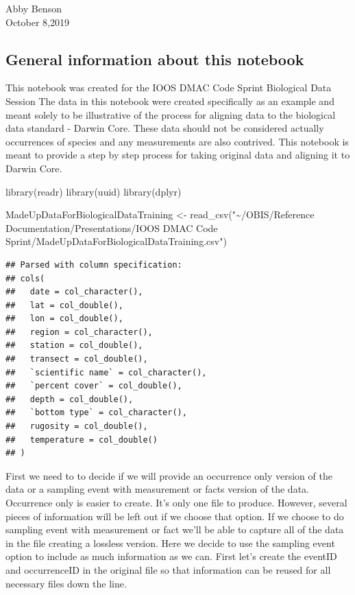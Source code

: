 \documentclass[
]{book}
\newenvironment{Shaded}{\begin{snugshade}}{\end{snugshade}}
\newcommand{\FunctionTok}[1]{\textcolor[rgb]{0.00,0.00,0.00}{#1}}
\newcommand{\NormalTok}[1]{#1}
\newcommand{\OtherTok}[1]{\textcolor[rgb]{0.56,0.35,0.01}{#1}}
\newcommand{\StringTok}[1]{\textcolor[rgb]{0.31,0.60,0.02}{#1}}
\begin{document}
Abby Benson\\
October 8,2019

\hypertarget{general-information-about-this-notebook}{%
\subsection{General information about this notebook}\label{general-information-about-this-notebook}}

This notebook was created for the IOOS DMAC Code Sprint Biological Data Session
The data in this notebook were created specifically as an example and meant solely to be
illustrative of the process for aligning data to the biological data standard - Darwin Core.
These data should not be considered actually occurrences of species and any measurements
are also contrived. This notebook is meant to provide a step by step process for taking
original data and aligning it to Darwin Core.

\begin{Shaded}
\begin{Highlighting}[]
\FunctionTok{library}\NormalTok{(readr)}
\FunctionTok{library}\NormalTok{(uuid)}
\FunctionTok{library}\NormalTok{(dplyr)}

\NormalTok{MadeUpDataForBiologicalDataTraining }\OtherTok{\textless{}{-}} \FunctionTok{read\_csv}\NormalTok{(}\StringTok{"\textasciitilde{}/OBIS/Reference Documentation/Presentations/IOOS DMAC Code Sprint/MadeUpDataForBiologicalDataTraining.csv"}\NormalTok{)}
\end{Highlighting}
\end{Shaded}

\begin{verbatim}
## Parsed with column specification:
## cols(
##   date = col_character(),
##   lat = col_double(),
##   lon = col_double(),
##   region = col_character(),
##   station = col_double(),
##   transect = col_double(),
##   `scientific name` = col_character(),
##   `percent cover` = col_double(),
##   depth = col_double(),
##   `bottom type` = col_character(),
##   rugosity = col_double(),
##   temperature = col_double()
## )
\end{verbatim}

First we need to to decide if we will provide an occurrence only version of the data or
a sampling event with measurement or facts version of the data. Occurrence only is easier
to create. It's only one file to produce. However, several pieces of information will be
left out if we choose that option. If we choose to do sampling event with measurement or
fact we'll be able to capture all of the data in the file creating a lossless version.
Here we decide to use the sampling event option to include as much information as we can.
First let's create the eventID and occurrenceID in the original file so that information
can be reused for all necessary files down the line.
\end{document}
